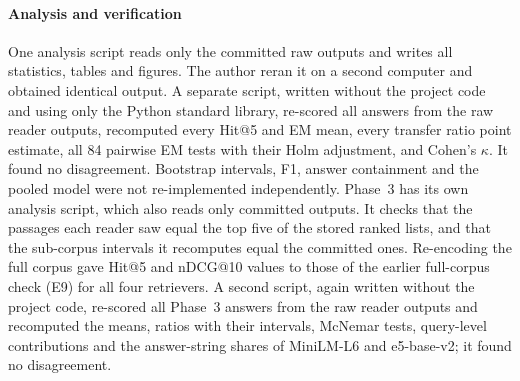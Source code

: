 \paragraph{Analysis and verification}
One analysis script reads only the committed raw outputs and writes all statistics, tables and figures. The author reran it on a second computer and obtained identical output. A separate script, written without the project code and using only the Python standard library, re-scored all  answers from the raw reader outputs, recomputed every Hit@5 and EM mean, every transfer ratio point estimate, all 84 pairwise EM tests with their Holm adjustment, and Cohen's $\kappa$. It found no disagreement. Bootstrap intervals, F1, answer containment and the pooled model were not re-implemented independently. Phase~3 has its own analysis script, which also reads only committed outputs. It checks that the passages each reader saw equal the top five of the stored ranked lists, and that the sub-corpus intervals it recomputes equal the committed ones. Re-encoding the full corpus gave Hit@5 and nDCG@10 values  to those of the earlier full-corpus check (E9) for all four retrievers. A second script, again written without the project code, re-scored all  Phase~3 answers from the raw reader outputs and recomputed the means, ratios with their intervals, McNemar tests, query-level contributions and the answer-string shares of MiniLM-L6 and e5-base-v2; it found no disagreement.

